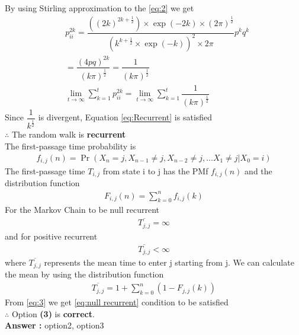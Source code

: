 \documentclass[journal,12pt,twocolumn]{IEEEtran}
\begin{document}
\begin{enumerate}
By using Stirling approximation to the \eqref{eq:2} we get 
\begin{align}
&p^{2k}_{ii} = \dfrac{ \left((2k)^{2k+\frac{1}{2}}\right)\times \exp(-2k)\times(2\pi)^{\frac{1}{2}}}{\left(k^{k+\frac{1}{2}}\times \exp(-k)\right)^2\times
2\pi}p^kq^k\\
&= \dfrac{(4pq)^{2k}}{(k\pi)^{\frac{1}{2}}} = \dfrac{1}{(k\pi)^{\frac{1}{2}}}\\
&\lim_{t \to \infty}\sum_{k=1}^{t} p^{2k}_{ii} = \lim_{t \to \infty}\sum_{k=1}^{t} \dfrac{1}{(k\pi)^{\frac{1}{2}}}
\end{align}
Since $\dfrac{1}{k^\frac{1}{2}}$ is divergent, Equation \eqref{eq:Recurrent} is satisfied\\
$\therefore$ The random walk is \textbf{recurrent}\\
The first-passage time probability is 
\begin{align}
f_{i,j}(n) = \Pr(X_n = j, X_{n-1} \neq j, X_{n-2} \neq j, ... X_1 \neq j | X_0 = i )
\end{align}
The first-passage time $T_{i,j}$ from state i to j has the PMf $f_{i,j}(n)$ and the distribution function
\begin{align}
F_{i,j}(n) = \sum _{k=0}^n f_{i,j}(k) \label{eq:3}
\end{align}
For the Markov Chain to be null recurrent 
\begin{align}
\overline{T_{j,j}} = \infty \label{eq:null recurrent}
\end{align}
and for positive recurrent 
\begin{align}
\overline{T_{j,j}} < \infty
\end{align}
where $\overline{T_{j,j}}$ represents the mean time to enter j starting from j. We can calculate the mean by using the distribution function 
\begin{align}
\overline{T_{j,j}} = 1 + \sum _{k=0}^n \left(1 - F_{j,j}(k)\right)
\end{align}
From \eqref{eq:3} we get \eqref{eq:null recurrent} condition to be satisfied \\
$\therefore$ Option \textbf{(3)} is \textbf{correct}.\\
\textbf{Answer :} option2, option3
\end{enumerate}
\end{document}
